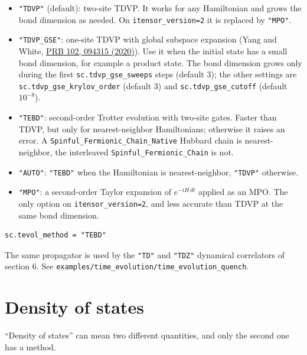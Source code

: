 \documentclass[11pt]{article}
\providecommand{\tightlist}{\setlength{\itemsep}{0pt}\setlength{\parskip}{0pt}}
\begin{document}
\begin{itemize}
\tightlist
\item
  \texttt{"TDVP"} (default): two-site TDVP. It works for any Hamiltonian and
  grows the bond dimension as needed. On \texttt{itensor\_\allowbreak{}version=2} it is
  replaced by \texttt{"MPO"}.
\item
  \texttt{"TDVP\_\allowbreak{}GSE"}: one-site TDVP with global subspace expansion (Yang and
  White, \href{https://arxiv.org/abs/2005.06104}{PRB 102, 094315 (2020)}). Use
  it when the initial state has a small bond dimension, for example a
  product state. The bond dimension grows only during the first
  \texttt{sc.\allowbreak{}tdvp\_\allowbreak{}gse\_\allowbreak{}sweeps} steps (default 3); the other settings are
  \texttt{sc.\allowbreak{}tdvp\_\allowbreak{}gse\_\allowbreak{}krylov\_\allowbreak{}order} (default 3) and \texttt{sc.\allowbreak{}tdvp\_\allowbreak{}gse\_\allowbreak{}cutoff}
  (default \(10^{-8}\)).
\item
  \texttt{"TEBD"}: second-order Trotter evolution with two-site gates. Faster
  than TDVP, but only for nearest-neighbor Hamiltonians; otherwise it
  raises an error. A \texttt{Spinful\_\allowbreak{}Fermionic\_\allowbreak{}Chain\_\allowbreak{}Native} Hubbard chain is
  nearest-neighbor, the interleaved \texttt{Spinful\_\allowbreak{}Fermionic\_\allowbreak{}Chain} is not.
\item
  \texttt{"AUTO"}: \texttt{"TEBD"} when the Hamiltonian is nearest-neighbor, \texttt{"TDVP"}
  otherwise.
\item
  \texttt{"MPO"}: a second-order Taylor expansion of \(e^{-iH\,dt}\) applied as an
  MPO. The only option on \texttt{itensor\_\allowbreak{}version=2}, and less accurate than TDVP
  at the same bond dimension.
\end{itemize}

\begin{lstlisting}
sc.tevol_method = "TEBD"
\end{lstlisting}

The same propagator is used by the \texttt{"TD"} and \texttt{"TDZ"} dynamical
correlators of section 6. See \texttt{examples/time\_\allowbreak{}evolution/time\_\allowbreak{}evolution\_\allowbreak{}quench}.

\section{Density of states}

``Density of states'' can mean two different quantities, and only the second
one has a method.
\end{document}
